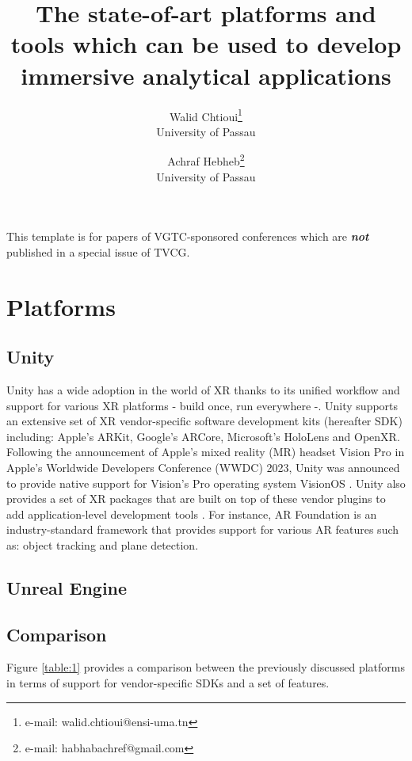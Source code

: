 \documentclass{vgtc}                          %
\title{The state-of-art
platforms and tools which can be used to develop immersive analytical
applications}
\author{Walid Chtioui\thanks{e-mail: walid.chtioui@ensi-uma.tn}\\ %
        \scriptsize University of Passau %
\and Achraf Hebheb\thanks{e-mail: habhabachref@gmail.com}\\ %
     \scriptsize University of Passau}
\begin{document}
\maketitle
This template is for papers of VGTC-sponsored conferences which are
\emph{\textbf{not}} published in a special issue of TVCG.

\section{Platforms}
\subsection{Unity}
Unity has a wide adoption in the world of XR thanks to its unified workflow
and support for various XR platforms - build once, run
everywhere -. Unity supports an extensive set of XR vendor-specific software
development kits (hereafter SDK) including: Apple's ARKit, Google's ARCore,
Microsoft's HoloLens and OpenXR. Following the announcement of Apple's
mixed reality (MR) headset Vision Pro in Apple's Worldwide Developers
Conference (WWDC) 2023, Unity was announced to provide native support for
Vision's Pro operating system VisionOS \cite{web:vision_pro_unity}.
Unity also provides a set of XR packages that are built on top of these vendor
plugins to add application-level development tools \cite{unity:xr_packages}.
For instance, AR Foundation is an industry-standard framework that provides
support for various AR features such as: object tracking and plane detection.
\subsection{Unreal Engine}
\subsection{Comparison}
Figure \ref{table:1} provides a comparison between the previously discussed
platforms in terms of support for vendor-specific SDKs and a set of features.
\end{document}

